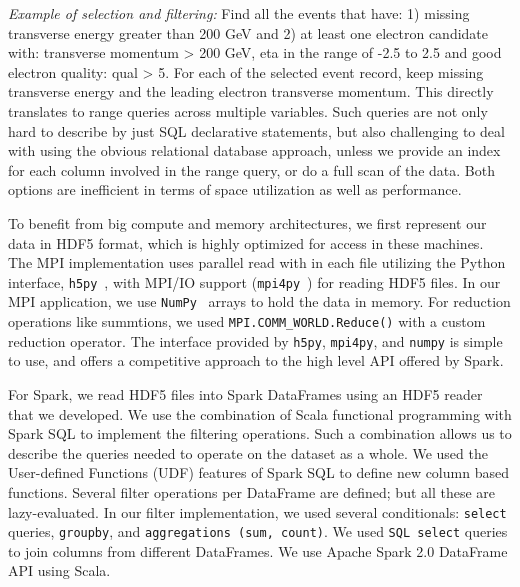 \documentclass[10pt, twocolumn]{article}
\begin{document}
\textit{Example of selection and filtering:} Find all the events that have:
1) missing transverse energy greater than 200 GeV and 
2) at least one electron candidate with: transverse momentum > 200 GeV, eta in the range of -2.5 to 2.5
and good electron quality: qual > 5. 
For each of the selected event record, keep missing transverse energy and the leading electron transverse momentum.
This directly translates to range queries across multiple variables. Such queries are not only hard to 
describe by just SQL declarative statements, but also 
challenging to deal with using the obvious relational database approach, 
unless we provide an index for each column involved in the range query, or do a 
full scan of the data. Both options are inefficient in terms of space utilization 
as well as performance. 

To benefit from big compute and memory architectures, we first represent our data 
in HDF5 format, which is highly optimized for access in these machines. 
The MPI implementation uses parallel read with in each file utilizing the Python interface, \texttt{h5py}~\cite{h5py}, with MPI/IO support (\texttt{mpi4py}~\cite{mpi4py}) 
for reading HDF5 files. 
In our MPI application, we use \texttt{NumPy}~\cite{numpy} arrays to hold the data in memory. 
For reduction operations like summtions, we used
\texttt{MPI.COMM\_WORLD.Reduce()} with a custom reduction operator. 
The interface provided by \texttt{h5py}, \texttt{mpi4py}, and \texttt{numpy} 
is simple to use, and offers a competitive approach to the high level API offered by Spark. 

For Spark, we read HDF5 files into Spark DataFrames using an HDF5 reader that we developed. 
 We use the combination of Scala functional programming with Spark SQL to implement the filtering operations. 
 Such a combination allows us to describe the queries needed to operate on the dataset as a whole. 
We used the User-defined Functions (UDF) features of Spark SQL to define new column based 
functions. 
Several filter operations per DataFrame are defined; but all these are lazy-evaluated. 
In our filter implementation, we used several conditionals: 
\texttt{select} queries, \texttt{groupby}, and \texttt{aggregations (sum, count)}. 
We used \texttt{SQL select} queries to join columns from different DataFrames.
We use Apache Spark 2.0 DataFrame API using Scala.  
\end{document}
